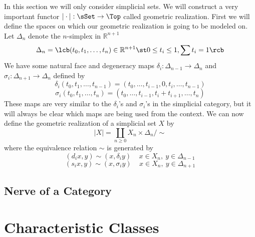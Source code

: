 In this section we will only consider simplicial sets. We will construct a very important functor $| \cdot | : \sSet \rightarrow \Top$ called geometric realization. First we will define the spaces on which our geometric realization is going to be modeled on. Let $\Delta_n$ denote the $n$-simplex in $\mathbb R^{n+1}$
\[ \Delta_n = \lcb (t_0,t_1,\ldots,t_n) \in \mathbb R^{n+1} \st 0 \leq t_i \leq 1, \sum t_i = 1 \rcb \]
We have some natural face and degeneracy maps $\delta_i : \Delta_{n-1} \rightarrow \Delta_n$ and $\sigma_i : \Delta_{n+1} \rightarrow \Delta_n$ defined by
\[ \delta_i(t_0,t_1,\ldots,t_{n-1}) = (t_0,\ldots,t_{i-1},0,t_i,\ldots,t_{n-1}) \]
\[ \sigma_i(t_0,t_1,\ldots,t_n) = (t_0,\ldots,t_{i-1},t_i+t_{i+1},\ldots,t_n) \]
These maps are very similar to the $\delta_i$'s and $\sigma_i$'s in the simplicial category, but it will always be clear which maps are being used from the context. We can now define the geometric realization of a simplicial set $X$ by
\[ |X| = \coprod_{n \geq 0} X_n \times \Delta_n / \sim \]
where the equivalence relation $\sim$ is generated by
\[ (d_i x, y) \sim (x, \delta_i y) \ \ \ \ \ x \in X_n, \ y \in \Delta_{n-1} \]
\[ (s_i x, y) \sim (x, \sigma_i y) \ \ \ \ \ x \in X_n, \ y \in \Delta_{n+1} \]

\subsection{Nerve of a Category}













\newpage
\section{Characteristic Classes}









\newpage







